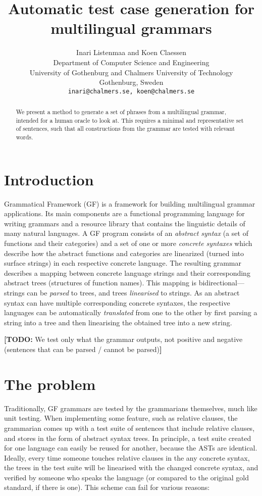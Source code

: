 \documentclass[11pt]{article}
\title{Automatic test case generation for multilingual grammars}
\author{Inari Listenmaa and Koen Claessen \\
  Department of Computer Science and Engineering \\
  University of Gothenburg and Chalmers University of Technology \\
  Gothenburg, Sweden \\
  {\tt inari@chalmers.se, koen@chalmers.se} }
\date{}
\newcommand{\todo}[1]{{\color{cyan}\textbf{[TODO: }#1\textbf{]}}}
\begin{document}
\maketitle
\begin{abstract}
  We present a method to generate a set of phrases from a multilingual
  grammar, intended for a human oracle to look at. This requires a
  minimal and representative set of sentences, such that all
  constructions from the grammar are tested with relevant words.
\end{abstract}

\section{Introduction}
Grammatical Framework (GF) \cite{ranta2011gfbook} 
is a framework for building multilingual grammar applications. Its main
components are a functional programming language for writing grammars
and a resource library that contains the linguistic details of many
natural languages.
A GF program consists of an \emph{abstract syntax} (a set of functions
and their categories) and a set of one or more
\emph{concrete syntaxes} which describe how the abstract
functions and categories are linearized (turned into surface strings) in each
respective concrete language. The resulting grammar
describes a mapping between concrete language strings and
their corresponding abstract trees (structures of function names).
This mapping is bidirectional---strings can be \emph{parsed} to
trees, and trees \emph{linearised} to strings.
As an abstract syntax can have multiple corresponding concrete syntaxes,
the respective languages can be automatically \emph{translated} from one to the other by
first parsing a string into a tree and then linearising the obtained tree
into a new string.

\todo{We test only what the grammar outputs, not positive and negative
  (sentences that can be parsed / cannot be parsed)}

\section{The problem}

Traditionally, GF grammars are tested by the grammarians themselves,
much like unit testing. When implementing some feature, such as 
relative clauses, the grammarian comes up with a test suite of 
sentences that include relative clauses, and stores in the form of 
abstract syntax trees. In principle, a test suite created for one 
language can easily be reused for another, because the ASTs are 
identical. Ideally, every time someone touches relative clauses 
in the any concrete syntax, the trees in the test suite will be 
linearised with the changed concrete syntax, and verified by someone
who speaks the language (or compared to the original gold standard, 
if there is one). This scheme can fail for various reasons: 
\end{document}

